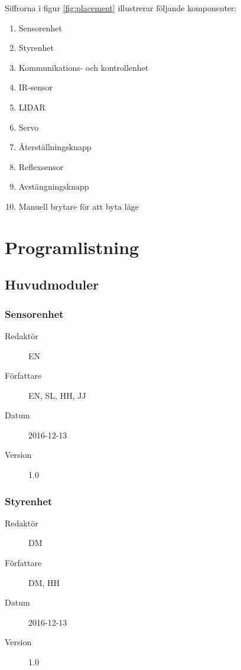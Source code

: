 \documentclass[a4paper,11pt]{article}
\begin{document}
Siffrorna i figur \ref{fig:placement} illustrerar följande komponenter:
\begin{enumerate}
\item Sensorenhet
\item Styrenhet
\item Kommunikations- och kontrollenhet
\item IR-sensor
\item LIDAR
\item Servo
\item Återställningsknapp
\item Reflexsensor
\item Avstängningsknapp
\item Manuell brytare för att byta läge
\end{enumerate}

\clearpage
\section{Programlistning}
\subsection{Huvudmoduler}
\subsubsection{Sensorenhet}

\begin{description}
\item[Redaktör] EN
\item[Författare] EN, SL, HH, JJ
\item[Datum] 2016-12-13
\item[Version] 1.0
\end{description}

\subsubsection{Styrenhet}

\begin{description}
\item[Redaktör] DM
\item[Författare] DM, HH
\item[Datum] 2016-12-13
\item[Version] 1.0
\end{description}
\end{document}
